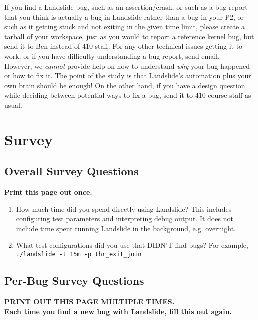 \documentclass{article}
\begin{document}
If you find a Landslide bug, such as an assertion/crash, or such as a bug report that you think is actually a bug in Landslide rather than a bug in your P2, or such as it getting stuck and not exiting in the given time limit, please create a tarball of your workspace, just as you would to report a reference kernel bug, but send it to Ben instead of 410 staff.
For any other technical issues getting it to work, or if you have difficulty understanding a bug report, send email.
\\

\noindent
However, we {\em cannot} provide help on how to understand {\em why} your bug happened or how to fix it. The point of the study is that Landslide's automation plus your own brain should be enough! On the other hand, if you have a design question while deciding between potential ways to fix a bug, send it to 410 course staff as usual.


\newpage

\section{Survey}
\subsection{Overall Survey Questions}

\begin{center}
{\bf Print this page out once.}
\end{center}

\begin{enumerate}
	\item How much time did you spend directly using Landslide? This includes configuring test parameters and interpreting debug output. It does not include time spent running Landslide in the background, e.g. overnight.
		\vspace{0.5in}

	\item What test configurations did you use that DIDN'T find bugs? For example, {\tt ./landslide -t 15m -p thr\_exit\_join}
\end{enumerate}

\newpage
\subsection{Per-Bug Survey Questions}
\begin{center}
{\bf \large PRINT OUT THIS PAGE MULTIPLE TIMES.
\\

Each time you find a new bug with Landslide, fill this out again.}
\end{center}
\end{document}
